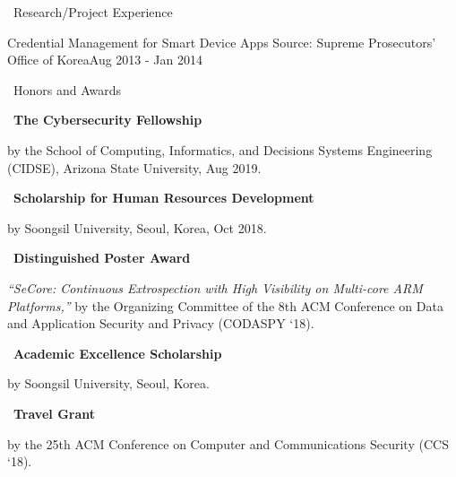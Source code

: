 \documentclass{resume} %
\begin{document}
\begin{rSection}{\faGenderless~Research/Project Experience}
	\begin{rSubsection3}
		{Credential Management for Smart Device Apps}
		{Source: Supreme Prosecutors' Office of Korea}{Aug 2013 - Jan 2014}
	\end{rSubsection3}
\end{rSection}


\begin{rSection}{\faGenderless~Honors and Awards}
    \strut\textbullet~{\bf The Cybersecurity Fellowship}\\
    \strut\hspace{1cm}\parbox[t]{\linegoal}{by the School of Computing, Informatics, and Decisions Systems Engineering (CIDSE), Arizona State University, Aug 2019.}

	\strut\textbullet~{\bf Scholarship for Human Resources Development}\\
	\strut\hspace{1cm}by Soongsil University, Seoul, Korea, Oct 2018.

	\strut\textbullet~{\bf Distinguished Poster Award}\\
	\strut\hspace{1cm}\parbox[t]{\linegoal}{\emph{``SeCore: Continuous Extrospection with High Visibility on Multi-core ARM Platforms,''} by the Organizing Committee of the 8th ACM Conference on Data and Application Security and Privacy (CODASPY `18).}

	\strut\textbullet~{\bf Academic Excellence Scholarship}\\
	\strut\hspace{1cm}by Soongsil University, Seoul, Korea.

	\strut\textbullet~{\bf Travel Grant}\\
	\strut\hspace{1cm}by the 25th ACM Conference on Computer and Communications Security (CCS `18).

\end{rSection}
\end{document}
